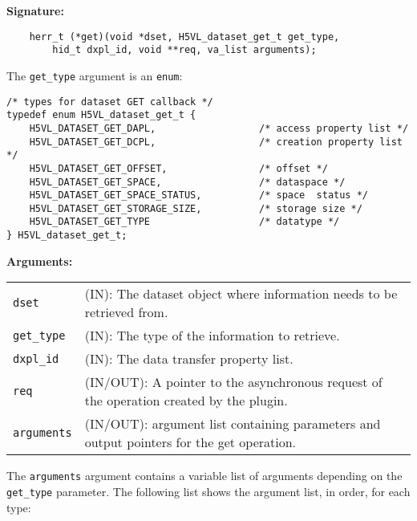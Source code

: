 \begin{mdframed}[style=bgbox]
\textbf{Signature:}
\begin{lstlisting}
    herr_t (*get)(void *dset, H5VL_dataset_get_t get_type, 
        hid_t dxpl_id, void **req, va_list arguments);
\end{lstlisting}

The \texttt{get\_type} argument is an \texttt{enum}:
\begin{lstlisting}
/* types for dataset GET callback */
typedef enum H5VL_dataset_get_t {
    H5VL_DATASET_GET_DAPL,                  /* access property list */
    H5VL_DATASET_GET_DCPL,                  /* creation property list */
    H5VL_DATASET_GET_OFFSET,                /* offset */
    H5VL_DATASET_GET_SPACE,                 /* dataspace */
    H5VL_DATASET_GET_SPACE_STATUS,          /* space  status */
    H5VL_DATASET_GET_STORAGE_SIZE,          /* storage size */
    H5VL_DATASET_GET_TYPE                   /* datatype */
} H5VL_dataset_get_t;
\end{lstlisting}

\textbf{Arguments:}\\
\begin{tabular}{l p{13.5cm}}
  \texttt{dset} & (IN): The dataset object where information needs to be
  retrieved from.\\
  \texttt{get\_type} & (IN): The type of the information to retrieve.\\
  \texttt{dxpl\_id} & (IN): The data transfer property list.\\
  \texttt{req} & (IN/OUT): A pointer to the asynchronous request of the
  operation created by the plugin.\\
  \texttt{arguments} & (IN/OUT): argument list containing parameters and
  output pointers for the get operation. \\
\end{tabular}
\end{mdframed}

The \texttt{arguments} argument contains a variable list of arguments
depending on the \texttt{get\_type} parameter. The following list shows
the argument list, in order, for each type:

